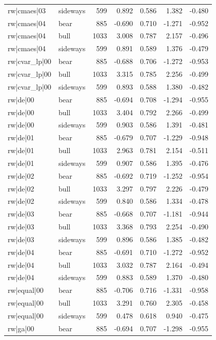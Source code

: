 \begin{table}
\begin{tabular}{llrrrrr}
rw|cmaes|03 & sideways & 599 & 0.892 & 0.586 & 1.382 & -0.480 \\
rw|cmaes|04 & bear & 885 & -0.690 & 0.710 & -1.271 & -0.952 \\
rw|cmaes|04 & bull & 1033 & 3.008 & 0.787 & 2.157 & -0.496 \\
rw|cmaes|04 & sideways & 599 & 0.891 & 0.589 & 1.376 & -0.479 \\
rw|cvar\_lp|00 & bear & 885 & -0.688 & 0.706 & -1.272 & -0.953 \\
rw|cvar\_lp|00 & bull & 1033 & 3.315 & 0.785 & 2.256 & -0.499 \\
rw|cvar\_lp|00 & sideways & 599 & 0.893 & 0.588 & 1.380 & -0.482 \\
rw|de|00 & bear & 885 & -0.694 & 0.708 & -1.294 & -0.955 \\
rw|de|00 & bull & 1033 & 3.404 & 0.792 & 2.266 & -0.499 \\
rw|de|00 & sideways & 599 & 0.903 & 0.586 & 1.391 & -0.481 \\
rw|de|01 & bear & 885 & -0.679 & 0.707 & -1.229 & -0.948 \\
rw|de|01 & bull & 1033 & 2.963 & 0.781 & 2.154 & -0.511 \\
rw|de|01 & sideways & 599 & 0.907 & 0.586 & 1.395 & -0.476 \\
rw|de|02 & bear & 885 & -0.692 & 0.719 & -1.252 & -0.954 \\
rw|de|02 & bull & 1033 & 3.297 & 0.797 & 2.226 & -0.479 \\
rw|de|02 & sideways & 599 & 0.840 & 0.586 & 1.334 & -0.478 \\
rw|de|03 & bear & 885 & -0.668 & 0.707 & -1.181 & -0.944 \\
rw|de|03 & bull & 1033 & 3.368 & 0.793 & 2.254 & -0.490 \\
rw|de|03 & sideways & 599 & 0.896 & 0.586 & 1.385 & -0.482 \\
rw|de|04 & bear & 885 & -0.691 & 0.710 & -1.272 & -0.952 \\
rw|de|04 & bull & 1033 & 3.032 & 0.787 & 2.164 & -0.494 \\
rw|de|04 & sideways & 599 & 0.883 & 0.589 & 1.370 & -0.480 \\
rw|equal|00 & bear & 885 & -0.706 & 0.716 & -1.331 & -0.958 \\
rw|equal|00 & bull & 1033 & 3.291 & 0.760 & 2.305 & -0.458 \\
rw|equal|00 & sideways & 599 & 0.478 & 0.618 & 0.940 & -0.475 \\
rw|ga|00 & bear & 885 & -0.694 & 0.707 & -1.298 & -0.955 \\

\end{tabular}
\end{table}
